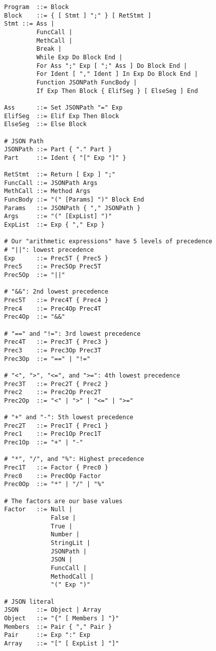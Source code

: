 \documentclass[12pt, letterpaper]{article}
\begin{document}
\begin{center}
    \begin{verbatim}
        Program  ::= Block
        Block    ::= { [ Stmt ] ";" } [ RetStmt ]
        Stmt ::= Ass |
                 FuncCall |
                 MethCall |
                 Break |
                 While Exp Do Block End |
                 For Ass ";" Exp [ ";" Ass ] Do Block End |
                 For Ident [ "," Ident ] In Exp Do Block End |
                 Function JSONPath FuncBody |
                 If Exp Then Block { ElifSeg } [ ElseSeg ] End

        Ass      ::= Set JSONPath "=" Exp
        ElifSeg  ::= Elif Exp Then Block
        ElseSeg  ::= Else Block

        # JSON Path
        JSONPath ::= Part { "." Part }
        Part     ::= Ident { "[" Exp "]" }

        RetStmt  ::= Return [ Exp ] ";"
        FuncCall ::= JSONPath Args
        MethCall ::= Method Args
        FuncBody ::= "(" [Params] ")" Block End
        Params   ::= JSONPath { "," JSONPath }
        Args     ::= "(" [ExpList] ")"
        ExpList  ::= Exp { "," Exp }

        # Our "arithmetic expressions" have 5 levels of precedence
        # "||": lowest precedence
        Exp      ::= Prec5T { Prec5 }
        Prec5    ::= Prec5Op Prec5T
        Prec5Op  ::= "||"

        # "&&": 2nd lowest precedence
        Prec5T   ::= Prec4T { Prec4 }
        Prec4    ::= Prec4Op Prec4T
        Prec4Op  ::= "&&"

        # "==" and "!=": 3rd lowest precedence
        Prec4T   ::= Prec3T { Prec3 }
        Prec3    ::= Prec3Op Prec3T
        Prec3Op  ::= "==" | "!="

        # "<", ">", "<=", and ">=": 4th lowest precedence
        Prec3T   ::= Prec2T { Prec2 }
        Prec2    ::= Prec2Op Prec2T
        Prec2Op  ::= "<" | ">" | "<=" | ">="

        # "+" and "-": 5th lowest precedence
        Prec2T   ::= Prec1T { Prec1 }
        Prec1    ::= Prec1Op Prec1T
        Prec1Op  ::= "+" | "-"

        # "*", "/", and "%": Highest precedence
        Prec1T   ::= Factor { Prec0 }
        Prec0    ::= Prec0Op Factor
        Prec0Op  ::= "*" | "/" | "%"

        # The factors are our base values
        Factor   ::= Null |
                     False |
                     True |
                     Number |
                     StringLit |
                     JSONPath |
                     JSON |
                     FuncCall |
                     MethodCall |
                     "(" Exp ")"

        # JSON literal
        JSON     ::= Object | Array
        Object   ::= "{" [ Members ] "}"
        Members  ::= Pair { "," Pair }
        Pair     ::= Exp ":" Exp
        Array    ::= "[" [ ExpList ] "]"
    \end{verbatim}
\end{center}
\end{document}
